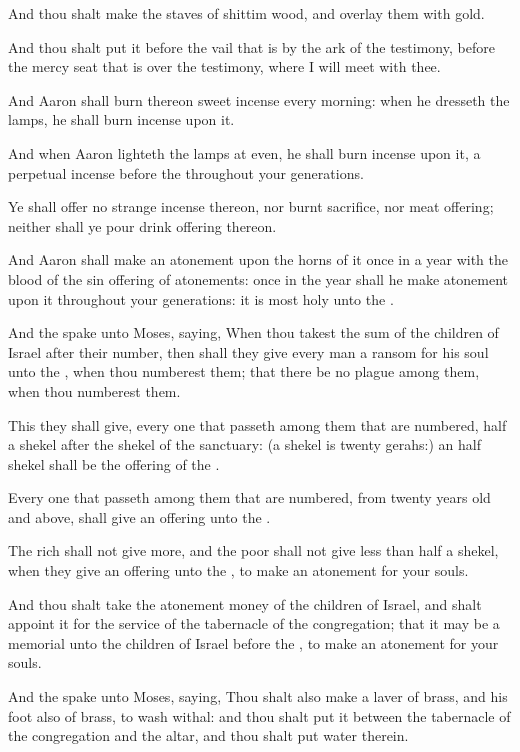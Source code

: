 \verse And thou shalt make the staves of shittim wood, and overlay them with gold.

\verse And thou shalt put it before the vail that is by the ark of the testimony, before the mercy seat that is over the testimony, where I will meet with thee.

\verse And Aaron shall burn thereon sweet incense every morning: when he dresseth the lamps, he shall burn incense upon it.

\verse And when Aaron lighteth the lamps at even, he shall burn incense upon it, a perpetual incense before the \LORD throughout your generations.

\verse Ye shall offer no strange incense thereon, nor burnt sacrifice, nor meat offering; neither shall ye pour drink offering thereon.

\verse And Aaron shall make an atonement upon the horns of it once in a year with the blood of the sin offering of atonements: once in the year shall he make atonement upon it throughout your generations: it is most holy unto the \LORD.

\verse And the \LORD spake unto Moses, saying, \verse When thou takest the sum of the children of Israel after their number, then shall they give every man a ransom for his soul unto the \LORD, when thou numberest them; that there be no plague among them, when thou numberest them.

\verse This they shall give, every one that passeth among them that are numbered, half a shekel after the shekel of the sanctuary: (a shekel is twenty gerahs:) an half shekel shall be the offering of the \LORD.

\verse Every one that passeth among them that are numbered, from twenty years old and above, shall give an offering unto the \LORD.

\verse The rich shall not give more, and the poor shall not give less than half a shekel, when they give an offering unto the \LORD, to make an atonement for your souls.

\verse And thou shalt take the atonement money of the children of Israel, and shalt appoint it for the service of the tabernacle of the congregation; that it may be a memorial unto the children of Israel before the \LORD, to make an atonement for your souls.

\verse And the \LORD spake unto Moses, saying, \verse Thou shalt also make a laver of brass, and his foot also of brass, to wash withal: and thou shalt put it between the tabernacle of the congregation and the altar, and thou shalt put water therein.

